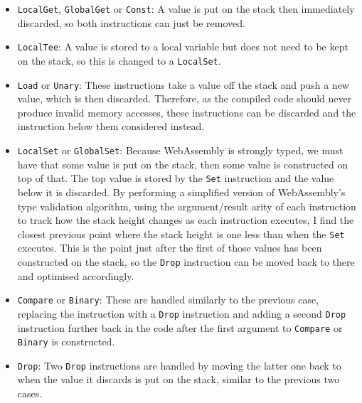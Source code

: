 \begin{itemize}
\item \verb|LocalGet|, \verb|GlobalGet| or \verb|Const|: A value is put on the stack then immediately discarded, so both instructions can just be removed.

\item \verb|LocalTee|: A value is stored to a local variable but does not need to be kept on the stack, so this is changed to a \verb|LocalSet|.

\item \verb|Load| or \verb|Unary|: These instructions take a value off the stack and push a new value, which is then discarded. Therefore, as the compiled code should never produce invalid memory accesses, these instructions can be discarded and the instruction below them considered instead.

\item \verb|LocalSet| or \verb|GlobalSet|: Because WebAssembly is strongly typed, we must have that some value is put on the stack, then some value is constructed on top of that. The top value is stored by the \verb|Set| instruction and the value below it is discarded. By performing a simplified version of WebAssembly's type validation algorithm, using the argument/result arity of each instruction to track how the stack height changes as each instruction executes, I find the closest previous point where the stack height is one less than when the \verb|Set| executes. This is the point just after the first of those values has been constructed on the stack, so the \verb|Drop| instruction can be moved back to there and optimised accordingly.

\item \verb|Compare| or \verb|Binary|: These are handled similarly to the previous case, replacing the instruction with a \verb|Drop| instruction and adding a second \verb|Drop| instruction further back in the code after the first argument to \verb|Compare| or \verb|Binary| is constructed.

\item \verb|Drop|: Two \verb|Drop| instructions are handled by moving the latter one back to when the value it discards is put on the stack, similar to the previous two cases.
\end{itemize}


